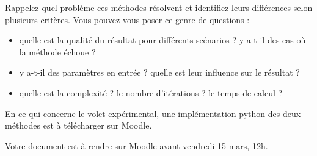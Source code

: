 \documentclass[a4paper,francais]{article}
\theoremstyle{definition}
\begin{document}
Rappelez quel problème ces méthodes résolvent et identifiez leurs différences
selon plusieurs critères. Vous pouvez vous poser ce genre de questions :
\begin{itemize}
\item quelle est la qualité du résultat pour différents scénarios ? y a-t-il des cas où la méthode échoue ? 
\item y a-t-il des paramètres en entrée ? quelle est leur influence sur le résultat ?
\item quelle est la complexité ? le nombre d'itérations ? le temps de calcul ?
\end{itemize}

En ce qui concerne le volet expérimental, une implémentation python des deux méthodes
est à télécharger sur Moodle. 

Votre document est à rendre sur Moodle avant vendredi 15 mars, 12h.  
\end{document}
